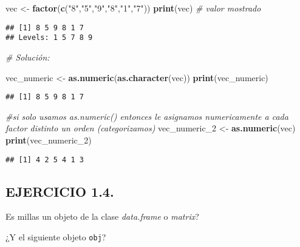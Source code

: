 \documentclass[]{article}
\newenvironment{Shaded}{\begin{snugshade}}{\end{snugshade}}
\newcommand{\CommentTok}[1]{\textcolor[rgb]{0.56,0.35,0.01}{\textit{#1}}}
\newcommand{\DecValTok}[1]{\textcolor[rgb]{0.00,0.00,0.81}{#1}}
\newcommand{\KeywordTok}[1]{\textcolor[rgb]{0.13,0.29,0.53}{\textbf{#1}}}
\newcommand{\NormalTok}[1]{#1}
\newcommand{\StringTok}[1]{\textcolor[rgb]{0.31,0.60,0.02}{#1}}
\begin{document}
\begin{Shaded}
\begin{Highlighting}[]
\NormalTok{vec <-}\StringTok{ }\KeywordTok{factor}\NormalTok{(}\KeywordTok{c}\NormalTok{(}\StringTok{"8"}\NormalTok{,}\StringTok{"5"}\NormalTok{,}\StringTok{"9"}\NormalTok{,}\StringTok{"8"}\NormalTok{,}\StringTok{"1"}\NormalTok{,}\StringTok{"7"}\NormalTok{))}
\KeywordTok{print}\NormalTok{(vec) }\CommentTok{# valor mostrado}
\end{Highlighting}
\end{Shaded}

\begin{verbatim}
## [1] 8 5 9 8 1 7
## Levels: 1 5 7 8 9
\end{verbatim}

\begin{Shaded}
\begin{Highlighting}[]
\CommentTok{# Solución:}

\NormalTok{vec_numeric <-}\StringTok{ }\KeywordTok{as.numeric}\NormalTok{(}\KeywordTok{as.character}\NormalTok{(vec))}
\KeywordTok{print}\NormalTok{(vec_numeric)}
\end{Highlighting}
\end{Shaded}

\begin{verbatim}
## [1] 8 5 9 8 1 7
\end{verbatim}

\begin{Shaded}
\begin{Highlighting}[]
\CommentTok{#si solo usamos as.numeric() entonces le asignamos numericamente a cada factor distinto un orden (categorizamos)}
\NormalTok{vec_numeric_}\DecValTok{2}\NormalTok{ <-}\StringTok{ }\KeywordTok{as.numeric}\NormalTok{(vec)}
\KeywordTok{print}\NormalTok{(vec_numeric_}\DecValTok{2}\NormalTok{)}
\end{Highlighting}
\end{Shaded}

\begin{verbatim}
## [1] 4 2 5 4 1 3
\end{verbatim}

\hypertarget{ejercicio-1.4.}{%
\subsection{EJERCICIO 1.4.}\label{ejercicio-1.4.}}

Es millas un objeto de la clase \emph{data.frame} o \emph{matrix}?

¿Y el siguiente objeto \texttt{obj}?
\end{document}
